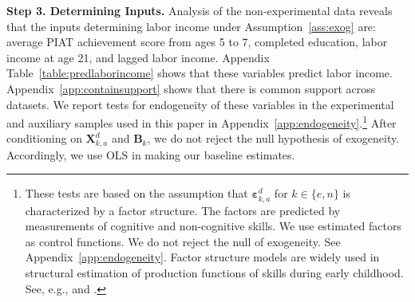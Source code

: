 \textbf{Step 3. Determining Inputs.} Analysis of the non-experimental data reveals that the inputs determining labor income under Assumption~\ref{ass:exog} are: average PIAT achievement score from ages 5 to 7, completed education, labor income at age 21, and lagged labor income. Appendix Table~\ref{table:predlaborincome} shows that these variables predict labor income. Appendix~\ref{app:containsupport} shows that there is common support across datasets. We report tests for endogeneity of these variables in the experimental and auxiliary samples used in this paper in Appendix~\ref{app:endogeneity}.\footnote{These tests are based on the assumption that $\bm{\varepsilon}_{k,a}^d$ for $k \in \{e,n\}$ is characterized by a factor structure. The factors are predicted by measurements of cognitive and non-cognitive skills. We use estimated factors as control functions. We do not reject the null of exogeneity. See Appendix~\ref{app:endogeneity}. Factor structure models are widely used in structural estimation of production functions of skills during early childhood. See, e.g., \citet{Cunha_Heckman_2008_JHR} and \citet{Cunha_Heckman_etal_2010_est_tech_cognoncog}.} After conditioning on $\bm{X}_{k,a}^d$ and $\bm{B}_{k}$, we do not reject the null hypothesis of exogeneity. Accordingly, we use OLS in making our baseline estimates.

